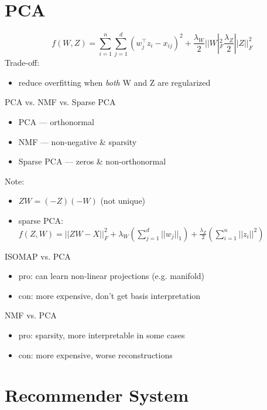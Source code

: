 \documentclass[10pt,landscape,a4paper]{article}
\begin{document}
\begin{multicols*}{5}
\section{PCA}
\begin{dmath*}
    f(W,Z) = \sum_{i=1}^{n} \sum_{j=1}^{d} (w_j^\intercal z_i - x_{ij})^2 + \frac{\lambda_W}{2} ||W|_F^2 \frac{\lambda_Z}{2} ||Z||_F^2
\end{dmath*}
Trade-off:
\begin{itemize}
    \item reduce overfitting when \emph{both} W and Z are regularized
\end{itemize}
PCA vs. NMF vs. Sparse PCA
\begin{itemize}
    \item PCA --- orthonormal
    \item NMF --- non-negative \& sparsity
    \item Sparse PCA --- zeros \& non-orthonormal
\end{itemize}
Note:
\begin{itemize}
    \item \(ZW = (-Z)(-W)\) (not unique)
    \item sparse PCA: \(f(Z,W) = ||ZW-X||_F^2 + \lambda_W (\sum_{j=1}^{d} ||w_j||_1) +\frac{\lambda_Z}{2} (\sum_{i=1}^{n} ||z_i||^2)\)
\end{itemize}
ISOMAP vs. PCA
\begin{itemize}
    \item pro: can learn non-linear projections (e.g. manifold)
    \item con: more expensive, don't get basis interpretation
\end{itemize}
NMF vs. PCA
\begin{itemize}
    \item pro: sparsity, more interpretable in some cases
    \item con: more expensive, worse reconstructions
\end{itemize}

\section{Recommender System}


\end{multicols*}
\end{document}
